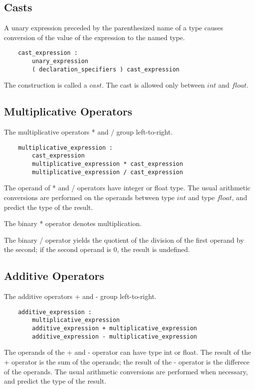\documentclass[letterpaper,12pt]{article}
\begin{document}
\subsection{Casts}
A unary expression preceded by the parenthesized name of a type causes conversion of the value of the expression to the named type.
\begin{lstlisting}
	cast_expression :
		unary_expression
		( declaration_specifiers ) cast_expression
\end{lstlisting}
The construction is called a $cast$. The cast is allowed only between $int$ and $float$.

\subsection{Multiplicative Operators}
The multiplicative operators * and / group left-to-right.
\begin{lstlisting}
	multiplicative_expression :
		cast_expression
		multiplicative_expression * cast_expression
		multiplicative_expression / cast_expression
\end{lstlisting}
The operand of * and / operators have integer or float type. The usual arithmetic conversions are performed on the operands between type $int$ and type $float$, and predict the type of the result. \newline 

The binary * operator denotes multiplication. \newline 

The binary / operator yields the quotient of the division of the first operand by the second; if the second operand is 0, the result is undefined. 

\subsection{Additive Operators}
The additive operators + and - group left-to-right.
\begin{lstlisting}
	additive_expression :
		multiplicative_expression
		additive_expression + multiplicative_expression
		additive_expression - multiplicative_expression
\end{lstlisting}
The operands of the + and - operator can have type int or float. The result of the + operator is the sum of the operands; the result of the - operator is the differece of the operands. The usual arithmetic conversions are performed when necessary, and predict the type of the result. \newline
\end{document}
